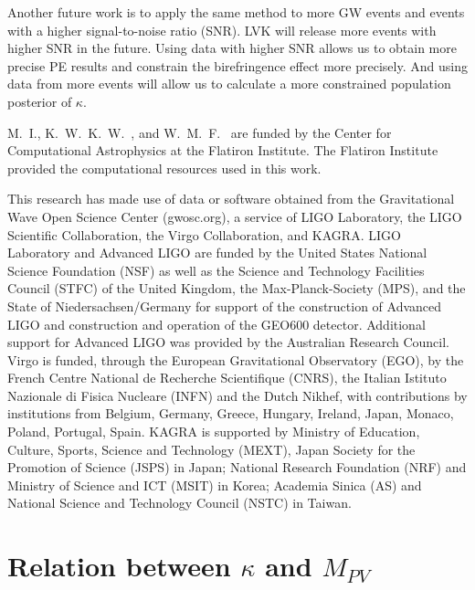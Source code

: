 \documentclass[aps,prd,twocolumn,superscriptaddress,preprintnumbers,floatfix,nofootinbib]{revtex4-2}
\begin{document}
Another future work is to apply the same method to more GW events and events with a higher signal-to-noise ratio (SNR).
LVK will release more events with higher SNR in the future.
Using data with higher SNR allows us to obtain more precise PE results and constrain the birefringence effect more precisely.
And using data from more events will allow us to calculate a more constrained population posterior of $\kappa$.

\begin{acknowledgments}
M.~I., K.~W.~K.~W.~, and W.~M.~F.~ are funded by the Center for Computational Astrophysics at the Flatiron Institute.
The Flatiron Institute provided the computational resources used in this work.

This research has made use of data or software obtained from the Gravitational Wave Open Science Center (gwosc.org), a service of LIGO Laboratory, the LIGO Scientific Collaboration, the Virgo Collaboration, and KAGRA.
LIGO Laboratory and Advanced LIGO are funded by the United States National Science Foundation (NSF) as well as the Science and Technology Facilities Council (STFC) of the United Kingdom, the Max-Planck-Society (MPS), and the State of Niedersachsen/Germany for support of the construction of Advanced LIGO and construction and operation of the GEO600 detector.
Additional support for Advanced LIGO was provided by the Australian Research Council.
Virgo is funded, through the European Gravitational Observatory (EGO), by the French Centre National de Recherche Scientifique (CNRS), the Italian Istituto Nazionale di Fisica Nucleare (INFN) and the Dutch Nikhef, with contributions by institutions from Belgium, Germany, Greece, Hungary, Ireland, Japan, Monaco, Poland, Portugal, Spain.
KAGRA is supported by Ministry of Education, Culture, Sports, Science and Technology (MEXT), Japan Society for the Promotion of Science (JSPS) in Japan; National Research Foundation (NRF) and Ministry of Science and ICT (MSIT) in Korea; Academia Sinica (AS) and National Science and Technology Council (NSTC) in Taiwan.
\end{acknowledgments}

\appendix

\section{Relation between $\kappa$ and $M_{PV}$}
\label{sec:M_PV_derivation}
\end{document}
